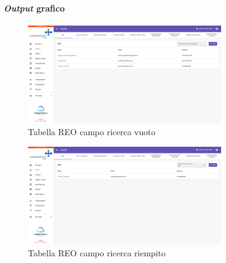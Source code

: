 

\newpage\paragraph{\textit{Output} grafico}
\begin{figure}[H]
    \centering
    \includegraphics[width=0.75\textwidth]{images/capitolo5/f5_search/TabReo_searchEmpty.png} 
    \caption{Tabella REO campo ricerca vuoto} 
    \label{fig:TabReo_searchEmpty}
\end{figure}

\begin{figure}[H]
    \centering
    \includegraphics[width=0.75\textwidth]{images/capitolo5/f5_search/TabReo_searchFilled.png} 
    \caption{Tabella REO campo ricerca riempito} 
    \label{fig:TabReo_searchFilled}
\end{figure}

